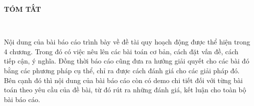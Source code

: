 \newpage
\changefontsizes{16pt}
\centerline{\textbf{TÓM TẮT}}\

\changefontsizes{13pt}
\setlength{\parindent}{2cm}
Nội dung của bài báo cáo trình bày về đề tài quy hoạch động được thể hiện trong 4 chương. Trong đó có việc nêu lên các bài toán cơ bản, cách đặt vấn đề, cách tiếp cận, ý nghĩa. Đồng thời báo cáo cũng đưa ra hướng giải quyết cho các bài đó bằng các phương pháp cụ thể, chỉ ra được cách đánh giá cho các giải pháp đó. Bên cạnh đó thì nội dung của bài báo cáo còn có demo chi tiết đối với từng bài toán theo yêu cầu của đề bài, từ đó rút ra những đánh giá, kết luận cho toàn bộ bài báo cáo.
